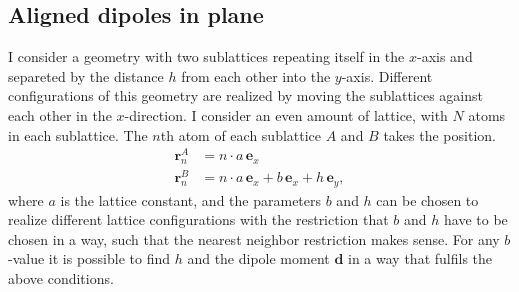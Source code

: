 \subsection*{Aligned dipoles in plane}
I consider a geometry with two sublattices repeating itself in the $x$-axis and separeted by the distance $h$ from each other into the $y$-axis. Different configurations of this geometry are realized by moving the sublattices against each other in the $x$-direction. I consider an even amount of lattice, with $N$ atoms in each sublattice. The $n$th atom of each sublattice $A$ and $B$ takes the position.
\begin{align*}
    \mathbf{r}^A_n&=n\cdot a \,\mathbf{e}_x\\
    \mathbf{r}^B_n&=n\cdot a\, \mathbf{e}_x + b\,\mathbf{e}_x+ h\,\mathbf{e}_y,
\end{align*}
where $a$ is the lattice constant, and the parameters $b$ and $h$ can be chosen to realize different lattice configurations with the restriction that $b$ and $h$ have to be chosen in a way, such that the nearest neighbor restriction makes sense. 
For any $b$-value it is possible to find $h$ and the dipole moment $\mathbf{d}$ in a way that fulfils the above conditions.\\\\




